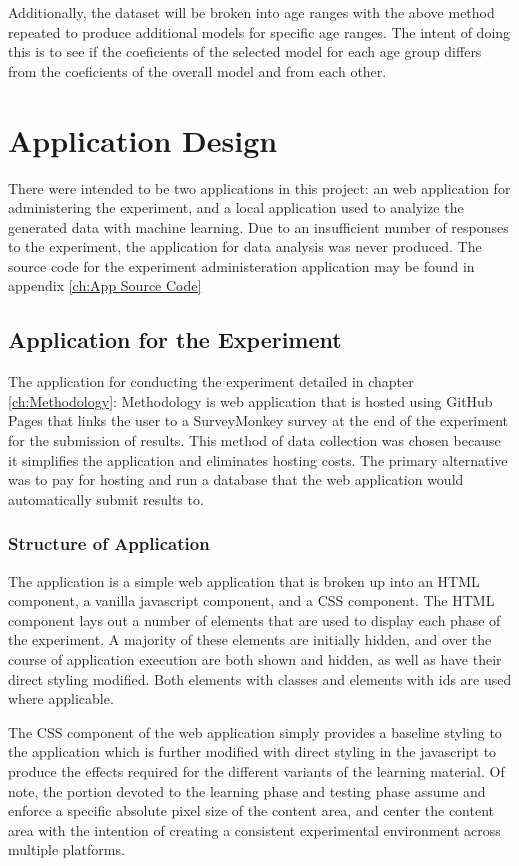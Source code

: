 \documentclass[12pt]{report}
\begin{document}
Additionally, the dataset will be broken into age ranges with the above method repeated to produce additional models for specific age ranges. The intent of doing this is to see if the coeficients of the selected model for each age group differs from the coeficients of the overall model and from each other.

\chapter{Application Design}

There were intended to be two applications in this project: an web application for administering the experiment, and a local application used to analyize the generated data with machine learning. Due to an insufficient number of responses to the experiment, the application for data analysis was never produced. The source code for the experiment administeration application may be found in appendix \ref{ch:App Source Code}

\section{Application for the Experiment}

The application for conducting the experiment detailed in chapter \ref{ch:Methodology}: Methodology is web application that is hosted using GitHub Pages that links the user to a SurveyMonkey survey at the end of the experiment for the submission of results. This method of data collection was chosen because it simplifies the application and eliminates hosting costs. The primary alternative was to pay for hosting and run a database that the web application would automatically submit results to.

\subsection{Structure of Application}

The application is a simple web application that is broken up into an HTML component, a vanilla javascript component, and a CSS component. The HTML component lays out a number of elements that are used to display each phase of the experiment. A majority of these elements are initially hidden, and over the course of application execution are both shown and hidden, as well as have their direct styling modified. Both elements with classes and elements with ids are used where applicable.

The CSS component of the web application simply provides a baseline styling to the application which is further modified with direct styling in the javascript to produce the effects required for the different variants of the learning material. Of note, the portion devoted to the learning phase and testing phase assume and enforce a specific absolute pixel size of the content area, and center the content area with the intention of creating a consistent experimental environment across multiple platforms.
\end{document}
